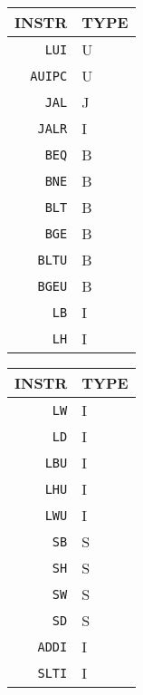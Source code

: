 \begin{table}
    \centering
    \begin{minipage}{.25\linewidth}
        \centering
        \begin{tabular}{r|l}
            \hline
            INSTR          & TYPE \\
            \hline
            \texttt{LUI}   & U    \\
            \texttt{AUIPC} & U    \\
            \hline
            \texttt{JAL}   & J    \\
            \texttt{JALR}  & I    \\
            \hline
            \texttt{BEQ}   & B    \\
            \texttt{BNE}   & B    \\
            \texttt{BLT}   & B    \\
            \texttt{BGE}   & B    \\
            \texttt{BLTU}  & B    \\
            \texttt{BGEU}  & B    \\
            \hline
            \texttt{LB}    & I    \\
            \texttt{LH}    & I    \\
        \end{tabular}
    \end{minipage}%
    \begin{minipage}{.25\linewidth}
        \centering
        \begin{tabular}{r|l}
            \hline
            INSTR          & TYPE \\
            \hline
            \texttt{LW}    & I    \\
            \texttt{LD}    & I    \\
            \texttt{LBU}   & I    \\
            \texttt{LHU}   & I    \\
            \texttt{LWU}   & I    \\
            \hline
            \texttt{SB}    & S    \\
            \texttt{SH}    & S    \\
            \texttt{SW}    & S    \\
            \texttt{SD}    & S    \\
            \hline
            \texttt{ADDI}  & I    \\
            \texttt{SLTI}  & I    \\

\end{tabular}
\end{minipage}
\end{table}
